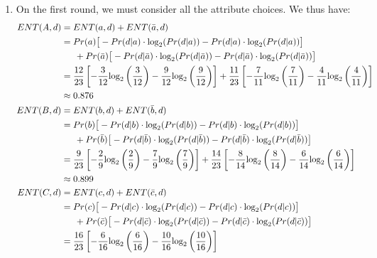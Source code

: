 \documentclass{article}
\begin{document}
\begin{enumerate}

\item On the first round, we must consider all the attribute choices.  We thus have:
	\begin{align*}
		ENT(A, d) &= ENT(a, d) + ENT(\bar a, d) \\
			&= Pr(a) \big[-Pr(d|a) \cdot \text{\text{log}}_2(Pr(d|a)) 
					-Pr(d|a) \cdot \text{\text{log}}_2(Pr(d|a)) \big]\\
				& \indent + Pr(\bar a)  \big[-Pr(d|\bar a) \cdot \text{\text{log}}_2(Pr(d|\bar a)) 
					- Pr(d|\bar a) \cdot \text{\text{log}}_2(Pr(d|\bar a)) \big] \\
			&= \frac {12} {23} 
					\left[ -\frac {3} {12} \text{\text{log}}_2\left(\frac{3}{12} \right) 
					- \frac{9}{12} \text{\text{log}}_2\left( \frac{9}{12} \right) \right]
				+ \frac {11} {23} 
					\left[ -\frac {7} {11} \text{\text{log}}_2 \left(\frac{7}{11} \right) 
					- \frac{4}{11} \text{\text{log}}_2 \left(\frac{4}{11} \right) \right]\\
			&\approx 0.876\\
		ENT(B, d) &= ENT(b, d) + ENT(\bar b, d) \\
			&= Pr(b) \big[-Pr(d|b) \cdot \text{\text{log}}_2(Pr(d|b)) 
					-Pr(d|b) \cdot \text{\text{log}}_2(Pr(d|b)) \big]\\
				& \indent + Pr(\bar b)  \big[-Pr(d|\bar b) \cdot \text{\text{log}}_2(Pr(d|\bar b)) 
					- Pr(d|\bar b) \cdot \text{\text{log}}_2(Pr(d|\bar b)) \big] \\
			&= \frac {9} {23} 
					\left[ -\frac {2} {9} \text{\text{log}}_2\left(\frac{2}{9} \right) 
					- \frac{7}{9} \text{\text{log}}_2\left( \frac{7}{9} \right) \right]
				+ \frac {14} {23} 
					\left[ -\frac {8} {14} \text{\text{log}}_2 \left(\frac{8}{14} \right) 
					- \frac{6}{14} \text{\text{log}}_2 \left(\frac{6}{14} \right) \right]\\
			&\approx 0.899\\
		ENT(C, d) &= ENT(c, d) + ENT(\bar c, d) \\
			&= Pr(c) \big[-Pr(d|c) \cdot \text{\text{log}}_2(Pr(d|c)) 
					-Pr(d|c) \cdot \text{\text{log}}_2(Pr(d|c)) \big]\\
				& \indent + Pr(\bar c)  \big[-Pr(d|\bar c) \cdot \text{\text{log}}_2(Pr(d|\bar c)) 
					- Pr(d|\bar c) \cdot \text{\text{log}}_2(Pr(d|\bar c)) \big] \\
			&= \frac {16} {23} 
					\left[ -\frac {6} {16} \text{\text{log}}_2\left(\frac{6}{16} \right) 
					- \frac{10}{16} \text{\text{log}}_2\left( \frac{10}{16} \right) \right]

\end{align*}
\end{enumerate}
\end{document}
